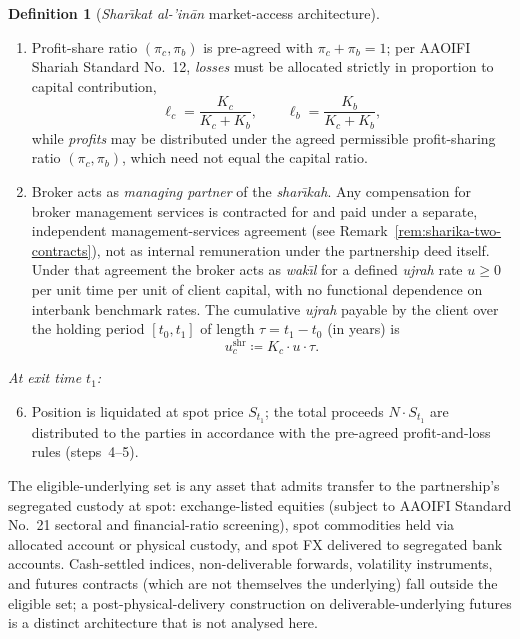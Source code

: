 \documentclass[preprint,12pt,authoryear]{elsarticle}
\theoremstyle{definition}
\newtheorem{definition}{Definition}[section]
\begin{document}
\begin{definition}[\emph{Shar\={\i}kat al-'in\={a}n} market-access
    architecture]
\begin{enumerate}
    treatment on the broker's books and the partnership's
    substantive economic reality. Whether any particular
    jurisdictional implementation satisfies all three is a
    matter of legal analysis outside the paper's scope; see
    Section~\ref{sec:disc-practical}.
    \item Profit-share ratio $(\pi_c, \pi_b)$ is pre-agreed with
    $\pi_c + \pi_b = 1$; per AAOIFI Shariah Standard No.~12,
    \emph{losses} must be allocated strictly in proportion to
    capital contribution,
    \begin{equation}
        \ell_c = \frac{K_c}{K_c + K_b},
        \qquad \ell_b = \frac{K_b}{K_c + K_b},
        \label{eq:sharika-loss-share}
    \end{equation}
    while \emph{profits} may be distributed under the agreed
    permissible profit-sharing ratio $(\pi_c, \pi_b)$, which
    need not equal the capital ratio.
    \item Broker acts as \emph{managing partner} of the
    \emph{shar\={\i}kah}. Any compensation for broker
    management services is contracted for and paid under a
    separate, independent management-services agreement (see
    Remark~\ref{rem:sharika-two-contracts}), not as internal
    remuneration under the partnership deed itself. Under that
    agreement the broker acts as \emph{wak\={\i}l} for a
    defined \emph{ujrah} rate $u \geq 0$ per unit time per unit
    of client capital, with no functional dependence on
    interbank benchmark rates. The cumulative \emph{ujrah}
    payable by the client over the holding period $[t_0, t_1]$
    of length $\tau = t_1 - t_0$ (in years) is
    \begin{equation}
        u^{\text{shr}}_c \coloneqq K_c \cdot u \cdot \tau.
        \label{eq:sharika-ujrah}
    \end{equation}
\end{enumerate}

\emph{At exit time $t_1$:}
\begin{enumerate}
    \setcounter{enumi}{5}
    \item Position is liquidated at spot price $S_{t_1}$; the
    total proceeds $N \cdot S_{t_1}$ are distributed to the
    parties in accordance with the pre-agreed profit-and-loss
    rules (steps~4--5).
\end{enumerate}

\noindent The eligible-underlying set is any asset that admits
transfer to the partnership's segregated custody at spot:
exchange-listed equities (subject to AAOIFI Standard No.~21
sectoral and financial-ratio screening), spot commodities held via
allocated account or physical custody, and spot FX delivered to
segregated bank accounts. Cash-settled indices, non-deliverable
forwards, volatility instruments, and futures contracts (which are
not themselves the underlying) fall outside the eligible set; a
post-physical-delivery construction on deliverable-underlying
futures is a distinct architecture that is not analysed here.
\end{definition}
\end{document}
